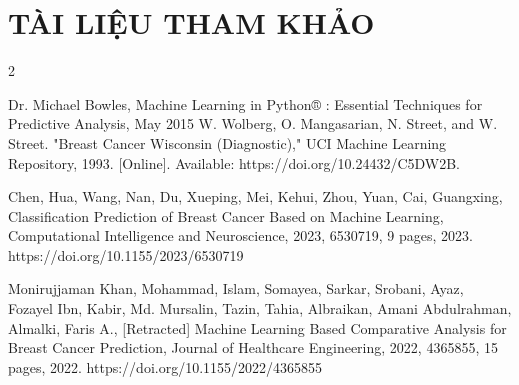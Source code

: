 \section{TÀI LIỆU THAM KHẢO}
\begin{thebibliography}{2}

Dr. Michael Bowles, Machine Learning in Python® : Essential Techniques for Predictive Analysis, May 2015
W. Wolberg, O. Mangasarian, N. Street, and W. Street. "Breast Cancer Wisconsin (Diagnostic)," UCI Machine Learning Repository, 1993. [Online]. Available: https://doi.org/10.24432/C5DW2B.

Chen, Hua, Wang, Nan, Du, Xueping, Mei, Kehui, Zhou, Yuan, Cai, Guangxing, Classification Prediction of Breast Cancer Based on Machine Learning, Computational Intelligence and Neuroscience, 2023, 6530719, 9 pages, 2023. https://doi.org/10.1155/2023/6530719

Monirujjaman Khan, Mohammad, Islam, Somayea, Sarkar, Srobani, Ayaz, Fozayel Ibn, Kabir, Md. Mursalin, Tazin, Tahia, Albraikan, Amani Abdulrahman, Almalki, Faris A., [Retracted] Machine Learning Based Comparative Analysis for Breast Cancer Prediction, Journal of Healthcare Engineering, 2022, 4365855, 15 pages, 2022. https://doi.org/10.1155/2022/4365855


\end{thebibliography}
